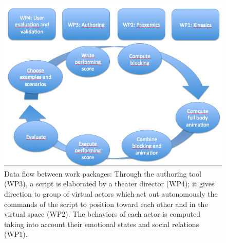 \begin{figure}[htbp]
\begin{center}
\includegraphics[width=0.9\linewidth]{DADAWORKFLOW.png}
\caption{Data flow between work packages: Through the authoring tool (WP3), a script is elaborated by a theater director (WP4); it gives direction to group of virtual
actors which act out autonomously the commands of the script to position toward each other and in the virtual space (WP2). The behaviors of each actor is computed 
taking into account their emotional states and social relations (WP1).}
\label{default}
\end{center}
\end{figure}


\endinput